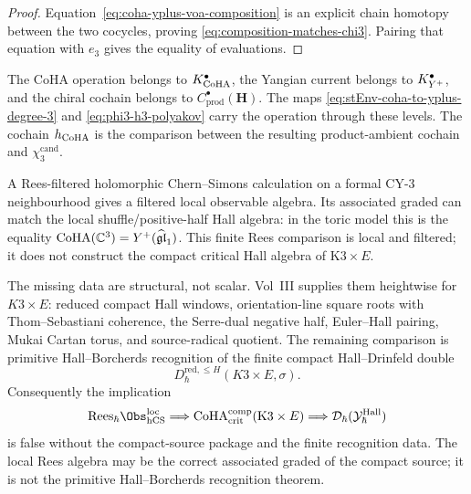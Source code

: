 \begin{proof}
Equation~\eqref{eq:coha-yplus-voa-composition} is an explicit chain
homotopy between the two cocycles, proving
\eqref{eq:composition-matches-chi3}.  Pairing that equation with
\(e_3\) gives the equality of evaluations.
\end{proof}

\begin{remark}
\label{rem:coha-yplus-voa-composition-discipline}
The CoHA operation belongs to \(K^\bullet_{\mathrm{CoHA}}\), the Yangian current
belongs to \(K^\bullet_{Y^{+}}\), and the chiral cochain belongs to
\(C^\bullet_{\mathrm{prod}}(\mathbf H)\).  The maps
\eqref{eq:stEnv-coha-to-yplus-degree-3} and
\eqref{eq:phi3-h3-polyakov} carry the operation through these levels.
The cochain \(h_{\mathrm{CoHA}}\) is the comparison between the resulting
product-ambient cochain and \(\chi_3^{\mathrm{cand}}\).
\end{remark}

\begin{remark}
\label{rem:finite-rees-hcs-hall-compact-source-obstruction}
A Rees-filtered holomorphic Chern--Simons calculation on a formal
CY-$3$ neighbourhood gives a filtered local observable algebra. Its
associated graded can match the local shuffle/positive-half Hall
algebra: in the toric model this is the equality
$\mathrm{CoHA}(\mathbb C^3)=Y^+(\widehat{\mathfrak{gl}}_1)$. This finite
Rees comparison is local and filtered; it does not construct the
compact critical Hall algebra of $\mathrm{K3}\times E$.

The missing data are structural, not scalar. Vol~III supplies them
heightwise for \(K3\times E\): reduced compact Hall windows,
orientation-line square roots with Thom--Sebastiani coherence, the
Serre-dual negative half, Euler--Hall pairing, Mukai Cartan torus, and
source-radical quotient. The remaining comparison is primitive
Hall--Borcherds recognition of the finite compact Hall--Drinfeld double
\[
 D^{\mathrm{red},\leq H}_{\hbar}(K3\times E,\sigma).
\]
Consequently the implication
\[
 \mathrm{Rees}_\hbar\Obs_{\mathrm{hCS}}^{\mathrm{loc}}
 \Longrightarrow
 \CoHA_{\mathrm{crit}}^{\mathrm{comp}}(\mathrm{K3}\times E)
 \Longrightarrow
 \mathcal D_\hbar(\mathcal Y^{\mathrm{Hall}}_\hbar)
\]
is false without the compact-source package and the finite recognition
data. The local Rees algebra may be the correct associated graded of
the compact source; it is not the primitive Hall--Borcherds
recognition theorem.
\end{remark}

